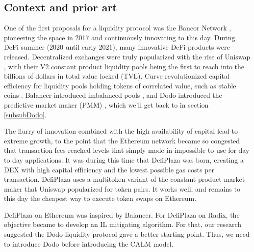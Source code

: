 \documentclass [10pt, twoside] {article}
\begin{document}
\subsection{Context and prior art}
One of the first proposals for a liquidity protocol was the Bancor Network \cite{bancorToken, bancorWP}, pioneering the space in 2017 and continuously innovating to this day. During DeFi summer (2020 until early 2021), many innovative DeFi products were released. Decentralized exchanges were truly popularized with the rise of Uniswap \cite{uniV1, uniV2, uniV3}, with their V2 constant product liquidity pools being the first to reach into the billions of dollars in total value locked (TVL). Curve revolutionized capital efficiency for liquidity pools holding tokens of correlated value, such as stable coins \cite{curve, curveV2}. Balancer introduced imbalanced pools \cite{balancer}, and Dodo introduced the predictive market maker (PMM) \cite{dodo}, which we'll get back to in section \ref{subsubDodo}.

The flurry of innovation combined with the high availability of capital lead to extreme growth, to the point that the Ethereum network became so congested that transaction fees reached levels that simply made in impossible to use for day to day applications. It was during this time that DefiPlaza was born, creating a DEX with high capital efficiency and the lowest possible gas costs per transaction. DefiPlaza uses a multitoken variant of the constant product market maker that Uniswap popularized for token pairs. It works well, and remains to this day the cheapest way to execute token swaps on Ethereum.

DefiPlaza on Ethereum \cite{defiplaza1, defiplaza2} was inspired by Balancer. For DefiPlaza on Radix, the objective became to develop an IL mitigating algorithm. For that, our research suggested the Dodo liquidity protocol gave a better starting point. Thus, we need to introduce Dodo before introducing the CALM model.
\end{document}
